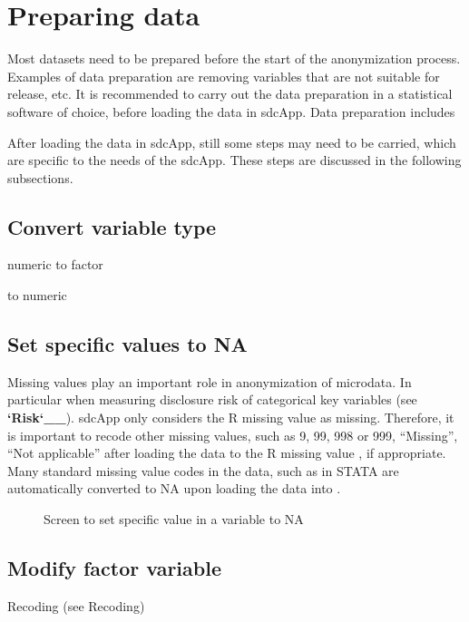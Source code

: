\documentclass[letterpaper,10pt,english]{sphinxmanual}
\begin{document}
\section{Preparing data}
\label{\detokenize{loadprepdata:preparing-data}}
Most datasets need to be prepared before the start of the anonymization process. Examples
of data preparation are removing variables that are not suitable for release, etc. It is
recommended to carry out the data preparation in a statistical software of choice, before
loading the data in sdcApp. Data preparation includes

After loading the data in sdcApp, still some steps may need to be carried, which are
specific to the needs of the sdcApp. These steps are discussed in the following subsections.


\subsection{Convert variable type}
\label{\detokenize{loadprepdata:convert-variable-type}}
numeric to factor

to numeric


\subsection{Set specific values to NA}
\label{\detokenize{loadprepdata:set-specific-values-to-na}}
Missing values play an important role in anonymization of microdata. In particular when
measuring disclosure risk of categorical key variables (see {\color{red}\bfseries{}{}`Risk{}`\_\_}). sdcApp only considers
the R missing value  as missing. Therefore, it is important to recode other missing values,
such as 9, 99, 998 or 999, “Missing”, “Not applicable” after loading the
data to the R missing value , if appropriate. Many standard missing value codes
in the data, such as  in STATA are automatically converted to NA upon loading
the data into .

\begin{figure}[htbp]
\centering
\capstart

\noindent{}
\caption{Screen to set specific value in a variable to NA}\label{\detokenize{loadprepdata:fig57}}\label{\detokenize{loadprepdata:id7}}\end{figure}


\subsection{Modify factor variable}
\label{\detokenize{loadprepdata:modify-factor-variable}}
Recoding (see Recoding)
\end{document}
